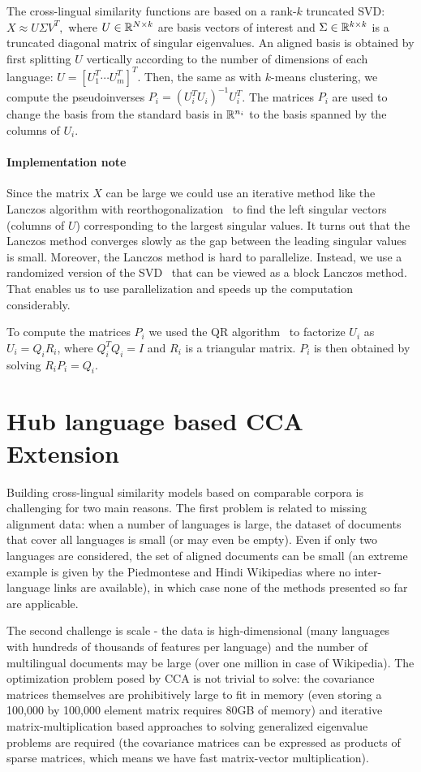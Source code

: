 The cross-lingual similarity functions are based on a rank-$k$ truncated SVD: 
$X \approx U \Sigma V^T,$ where $U \in \mathbb{R}^{N \times k}$ are basis vectors of 
interest and $\Sigma \in \mathbb{R}^{k \times k}$ is a truncated diagonal matrix of singular 
eigenvalues. An aligned basis is obtained by first splitting $U$ vertically according 
to the number of dimensions of each language: $U = [U_1^T \cdots U_m^T]^T$. Then, the 
same as with $k$-means clustering, we compute the pseudoinverses $P_i = (U_i^T U_i)^{-1} U_i^T$. 
The matrices $P_i$ are used to change the basis from the standard basis in $\mathbb{R}^{n_i}$ to the 
basis spanned by the columns of $U_i$.

\paragraph{Implementation note}
Since the matrix $X$ can be large we could use an iterative method like the Lanczos 
algorithm with reorthogonalization~\cite{golub} to find the left singular vectors 
(columns of $U$) corresponding to the largest singular values. It turns out that the 
Lanczos method converges slowly as the gap between the leading singular values is small. 
Moreover, the Lanczos method is hard to parallelize. Instead, we use a randomized version 
of the SVD~\cite{tropp} that can be viewed as a block Lanczos method. That enables us 
to use parallelization and speeds up the computation considerably.

To compute the matrices $P_i$ we used the QR algorithm~\cite{golub} to factorize 
$U_i$ as $U_i = Q_i R_i$, where $Q_i^TQ_i = I$ and $R_i$ is a triangular matrix. 
$P_i$ is then obtained by solving $R_i P_i = Q_i$.


\section{Hub language based CCA Extension}\label{sec:hublang}
Building cross-lingual similarity models based on comparable corpora is challenging for 
two main reasons. The first problem is related to missing alignment data: when a number 
of languages is large, the dataset of documents that cover all languages is small (or may 
even be empty). Even if only two languages are considered, the set of aligned documents 
can be small (an extreme example is given by the Piedmontese and Hindi Wikipedias where 
no inter-language links are available), in which case none of the methods presented so 
far are applicable.

The second challenge is scale - the data is high-dimensional (many languages with 
hundreds of thousands of features per language) and the number of multilingual documents may be large (over one million in case of Wikipedia). The optimization problem posed by CCA is not trivial to solve: the covariance matrices themselves are prohibitively 
large to fit in memory (even storing a 100,000 by 100,000 element matrix requires 
80GB of memory) and iterative matrix-multiplication based approaches to solving generalized 
eigenvalue problems are required (the covariance matrices can be expressed as products 
of sparse matrices, which means we have fast matrix-vector multiplication).

